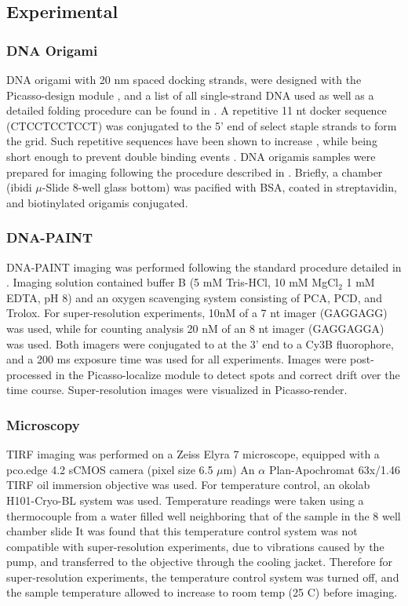 \subsection{Experimental}
\subsubsection{DNA Origami}
DNA origami with 20 nm spaced docking strands, were designed with the Picasso-design module \cite{schnitzbauer_2017}, 
  and a list of all single-strand DNA used as well as a detailed folding procedure can be found in \cite{schnitzbauer_2017}.
  A repetitive 11 nt docker sequence (CTCCTCCTCCT) was conjugated to the 5' end of select staple strands to form the grid.
  Such repetitive sequences have been shown to increase \pon, while being short enough to prevent double binding events \cite{civitci_2020}.
  DNA origamis samples were prepared for imaging following the procedure described in \cite{schnitzbauer_2017}. 
  Briefly, a chamber (ibidi $\mu$-Slide 8-well glass bottom) was pacified with BSA, coated in streptavidin, and biotinylated origamis conjugated. 

\subsubsection{DNA-PAINT}
DNA-PAINT imaging was performed following the standard procedure detailed in \cite{schnitzbauer_2017}. 
  Imaging solution contained buffer B (5 mM Tris-HCl, 10 mM MgCl$_2$ 1 mM EDTA, pH 8) and an oxygen scavenging system consisting of PCA, PCD, and Trolox.
  For super-resolution experiments, 10nM of a 7 nt imager (GAGGAGG) was used, while for \ours counting analysis 
  20 nM of an 8 nt imager (GAGGAGGA) was used.
  Both imagers were conjugated to at the 3' end to a Cy3B fluorophore, and a 200 ms exposure time was used for all experiments.
  Images were post-processed in the Picasso-localize module to detect spots and correct drift over the time course. 
  Super-resolution images were visualized in Picasso-render.

\subsubsection{Microscopy}
TIRF imaging was performed on a Zeiss Elyra 7 microscope, equipped with a pco.edge 4.2 sCMOS camera (pixel size 6.5 $\mu$m)
  An $\alpha$ Plan-Apochromat 63x/1.46 TIRF oil immersion objective was used.
  For temperature control, an okolab H101-Cryo-BL system was used. Temperature readings were taken using a thermocouple from a water filled well neighboring 
  that of the sample in the 8 well chamber slide 
  It was found that this temperature control system was not compatible with super-resolution experiments, 
  due to vibrations caused by the pump, and transferred to the objective through the cooling jacket.
  Therefore for super-resolution experiments, the temperature control system was turned off, 
  and the sample temperature allowed to increase to room temp (25 C) before imaging.


